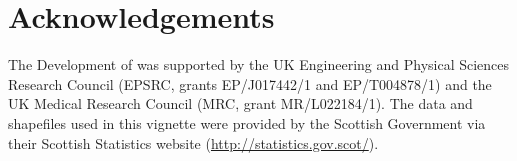 \documentclass[article, nojss]{jss}
\begin{document}
\section{Acknowledgements}
The Development of  was supported by the UK Engineering and Physical Sciences Research Council (EPSRC, grants EP/J017442/1 and EP/T004878/1) and the UK Medical Research Council (MRC, grant MR/L022184/1). The data and shapefiles used in this vignette were provided by the Scottish Government via their Scottish Statistics website (\url{http://statistics.gov.scot/}).



\end{document}
